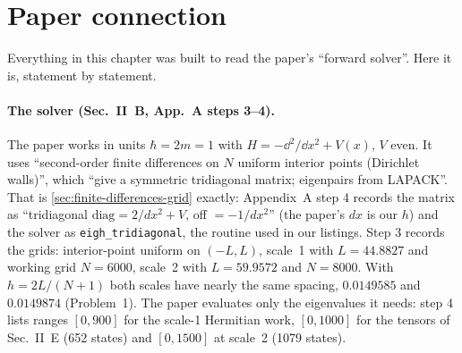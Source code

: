 \section{Paper connection}\label{sec:finite-differences-paper}

Everything in this chapter was built to read the paper's ``forward solver''. Here it is, statement by statement.

\paragraph{The solver (Sec.~II~B, App.~A steps 3--4).} The paper works in units $\hbar=2m=1$ with $H=-\dd^2/\dd x^2+V(x)$, $V$ even. It uses ``second-order finite differences on $N$ uniform interior points (Dirichlet walls)'', which ``give a symmetric tridiagonal matrix; eigenpairs from LAPACK''. That is \cref{sec:finite-differences-grid} exactly: Appendix~A step 4 records the matrix as ``tridiagonal $\mathrm{diag}=2/dx^2+V$, off $=-1/dx^2$'' (the paper's $dx$ is our $h$) and the solver as \texttt{eigh\_tridiagonal}, the routine used in our listings. Step 3 records the grids: interior-point uniform on $(-L,L)$, scale~1 with $L=44.8827$ and working grid $N=6000$, scale~2 with $L=59.9572$ and $N=8000$. With $h=2L/(N+1)$ both scales have nearly the same spacing, $0.0149585$ and $0.0149874$ (Problem~1). The paper evaluates only the eigenvalues it needs: step 4 lists ranges $[0,900]$ for the scale-1 Hermitian work, $[0,1000]$ for the tensors of Sec.~II~E (652 states) and $[0,1500]$ at scale~2 (1079 states).

